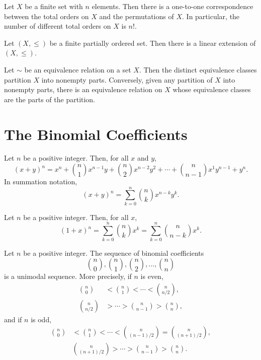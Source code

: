 \begin{theorem}
    \label{thm:4.5.1}
Let $X$ be a finite set with $n$ elements. Then there is a one-to-one correspondence between the total orders on $X$ and the permutations of $X$. In particular, the number of different total orders on $X$ is $n!$.
\end{theorem} 

\begin{theorem}
    \label{thm:4.5.2}
Let $(X, \leq)$ be a finite partially ordered set. Then there is a linear extension of $(X, \leq)$.
\end{theorem} 

\begin{theorem}
    \label{thm:4.5.3}
Let $\sim$ be an equivalence relation on a set $X$. Then the distinct equivalence classes partition $X$ into nonempty parts. Conversely, given any partition of $X$ into nonempty parts, there is an equivalence relation on $X$ whose equivalence classes are the parts of the partition.
\end{theorem} 

\chapter{The Binomial Coefficients}

\begin{theorem}
    \label{thm:5.2.1}
Let \( n \) be a positive integer. Then, for all \( x \) and \( y \),
\[
(x+y)^{n}=x^{n}+\binom{n}{1}x^{n-1}y+\binom{n}{2}x^{n-2}y^{2}+\cdots+\binom{n}{n-1}x^{1}y^{n-1}+y^{n}.
\]
In summation notation,
\[
(x+y)^n=\sum_{k=0}^n\binom{n}{k} x^{n-k} y^k.
\]
\end{theorem}

\begin{theorem}
    \label{thm:5.2.2}
Let \( n \) be a positive integer. Then, for all \( x \),
\[
(1+x)^n = \sum_{k=0}^n \binom{n}{k} x^k = \sum_{k=0}^n \binom{n}{n-k} x^k.
\]
\end{theorem}

\begin{theorem}
    \label{thm:5.3.1}
Let \( n \) be a positive integer. The sequence of binomial coefficients
\[
\binom{n}{0}, \binom{n}{1}, \binom{n}{2}, \ldots, \binom{n}{n}
\]
is a unimodal sequence. More precisely, if \( n \) is even,
\begin{align*}
\binom{n}{0} &< \binom{n}{1} < \cdots < \binom{n}{n/2}, \\
\binom{n}{n/2} &> \cdots > \binom{n}{n-1} > \binom{n}{n},
\end{align*}
and if \( n \) is odd,
\begin{align*}
\binom{n}{0} &< \binom{n}{1} < \cdots < \binom{n}{(n-1)/2} = \binom{n}{(n+1)/2}, \\
&\binom{n}{(n+1)/2} > \cdots > \binom{n}{n-1} > \binom{n}{n}.
\end{align*}
\end{theorem}

